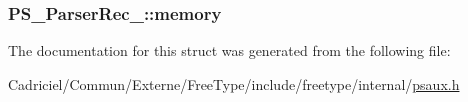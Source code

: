 \hypertarget{struct_p_s___parser_rec___a3e2206deb6c0d73f51c8c71d5db1db1f}{
\subsubsection[{memory}]{ P\-S\-\_\-\-Parser\-Rec\-\_\-\-::memory}}\label{struct_p_s___parser_rec___a3e2206deb6c0d73f51c8c71d5db1db1f}


The documentation for this struct was generated from the following file\-:\begin{DoxyCompactItemize}
\item 
Cadriciel/\-Commun/\-Externe/\-Free\-Type/include/freetype/internal/\hyperlink{psaux_8h}{psaux.\-h}\end{DoxyCompactItemize}
